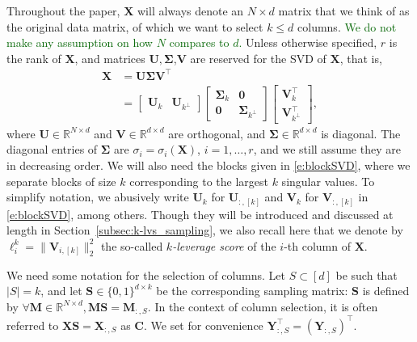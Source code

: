 \documentclass[twoside,11pt]{book}
\newcommand{\rev}[1]{\textcolor{darkgreen}{#1}}
\numberwithin{theorem}{chapter}
\numberwithin{definition}{chapter}
\numberwithin{proposition}{chapter}
\numberwithin{corollary}{chapter}
\numberwithin{example}{chapter}
\numberwithin{lemma}{chapter}
\numberwithin{assumption}{chapter}
\DeclareMathOperator{\Tran}{\intercal}
\begin{document}
Throughout the paper, $\bm{X}$ will always denote an $N\times d$ matrix that we think of as the original data matrix, of which we want to select $k\leq d$ columns. \rev{We do not make any assumption on how $N$ compares to $d$.} Unless otherwise specified, $r$ is the rank of $\bm{X}$, and matrices $\bm{U},\bm{\Sigma}$,$\bm{V}$ are reserved for the SVD of $\bm{X}$, that is,
\begin{align}
   \bm{X} &= \bm{U}\bm{\Sigma}\bm{V}^{\Tran}\\
   &=
\left[
\begin{array}{c|c}
\bm{U}_{k} & \bm{U}_{k^{\perp}}
\end{array}
\right]
\left[
\begin{array}{c|c}
\bm{\Sigma}_{k} & \bm{0} \\
\hline
\bm{0} & \bm{\Sigma}_{k^{\perp}}
\end{array}
\right]
\left[
\begin{array}{c}
\bm{V}_{k}^{\Tran} \\
\hline
\bm{V}_{k^{\perp}}^{\Tran}
\end{array}
\right],
\label{e:blockSVD}
\end{align}
where $\bm{U} \in \mathbb{R}^{N\times d}$ and $\bm{V} \in \mathbb{R}^{d \times d}$ are orthogonal, and $\bm{\Sigma} \in \mathbb{R}^{d \times d}$ is diagonal. The diagonal entries of $\bm{\Sigma}$ are $\sigma_i=\sigma_i(\bm{X})$, $i=1,\dots,r$, and we still assume they are in decreasing order. We will also need the blocks given in \eqref{e:blockSVD}, where we separate blocks of size $k$ corresponding to the largest $k$ singular values. To simplify notation, we abusively write $\bm{U}_{k}$ for $\bm{U}_{:,[k]}$ and $\bm{V}_{k}$ for $\bm{V}_{:,[k]}$ in \eqref{e:blockSVD}, among others. Though they will be introduced and discussed at length in Section~\ref{subsec:k-lvs_sampling}, we also recall here that we denote by $\ell_{i}^{k} = \|\bm{V}_{i,[k]}\|_{2}^{2}$ the so-called \emph{ $k$-leverage score} of the $i$-th column of $\bm{X}$.

We need some notation for the selection of columns. Let $S \subset [d]$ be such that $\vert S\vert =k$, and let $\bm{S} \in \{0,1\}^{d \times k}$ be the corresponding sampling matrix: $\bm{S}$ is defined by $\forall \bm{M} \in \mathbb{R}^{N\times d}, \bm{M}\bm{S} = \bm{M}_{:,S}$. In the context of column selection, it is often referred to $\bm{X}\bm{S} = \bm{X}_{:,S}$ as $\bm{C}$. We set for convenience $\bm{Y}_{:,S}^{\Tran} = (\bm{Y}_{:,S})^{\Tran}$.
\end{document}
